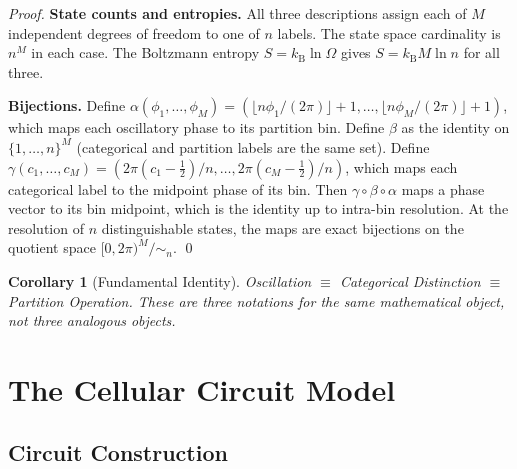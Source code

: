 \documentclass[11pt,twocolumn,a4paper]{article}
\newtheorem{corollary}[theorem]{Corollary}
\newcommand{\kb}{k_{\mathrm{B}}}
\begin{document}
\begin{proof}
\textbf{State counts and entropies.}  All three descriptions assign
each of $M$ independent degrees of freedom to one of $n$ labels.
The state space cardinality is $n^M$ in each case.  The Boltzmann
entropy $S = \kb \ln \Omega$ gives $S = \kb M \ln n$ for all three.

\textbf{Bijections.}  Define
$\alpha(\phi_1, \ldots, \phi_M) = (\lfloor n\phi_1/(2\pi) \rfloor + 1,
\ldots, \lfloor n\phi_M/(2\pi) \rfloor + 1)$, which maps each
oscillatory phase to its partition bin.  Define $\beta$ as the
identity on $\{1,\ldots,n\}^M$ (categorical and partition labels are
the same set).  Define $\gamma(c_1, \ldots, c_M) = (2\pi(c_1 -
\tfrac{1}{2})/n, \ldots, 2\pi(c_M - \tfrac{1}{2})/n)$, which maps
each categorical label to the midpoint phase of its bin.  Then
$\gamma \circ \beta \circ \alpha$ maps a phase vector to its
bin midpoint, which is the identity up to intra-bin resolution.
At the resolution of $n$ distinguishable states, the maps are exact
bijections on the quotient space $[0,2\pi)^M / {\sim_n}$.  \qed
\end{proof}

\begin{corollary}[Fundamental Identity]
\label{cor:fundamental}
Oscillation $\equiv$ Categorical Distinction $\equiv$
Partition Operation.  These are three notations for the same
mathematical object, not three analogous objects.
\end{corollary}


\section{The Cellular Circuit Model}
\label{sec:circuit-model}

\subsection{Circuit Construction}
\end{document}

